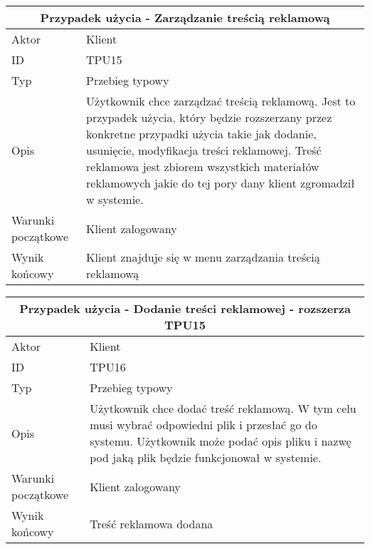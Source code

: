 \documentclass[10pt,a4paper,titlepage]{article} %
\begin{document}
		\begin {center}
		\begin{tabular}{|l|p{10cm}|}
		  \hline
		  \multicolumn{2}{|c|}{\bf Przypadek użycia - Zarządzanie treścią reklamową}\\\hline
		  \hline
		  Aktor & Klient \\ \hline
		  ID & TPU15 \\ \hline
		  Typ & Przebieg typowy \\ \hline
		  Opis & Użytkownik chce zarządzać treścią reklamową. Jest to przypadek
		  użycia, który będzie rozszerzany przez konkretne przypadki użycia takie jak
		  dodanie, usunięcie, modyfikacja treści reklamowej. Treść reklamowa jest
		  zbiorem wszystkich materiałów reklamowych jakie do tej pory dany klient
		  zgromadził w systemie.
		  \\
		  \hline Warunki początkowe & Klient zalogowany \\ \hline
		  Wynik końcowy & Klient znajduje się w menu zarządzania treścią reklamową  \\
		  \hline
		\end{tabular}
		\end{center}
		
		\begin {center}
		\begin{tabular}{|l|p{10cm}|}
		  \hline
		  \multicolumn{2}{|c|}{\bf Przypadek użycia - Dodanie treści
		  reklamowej - rozszerza TPU15}\\\hline
		  \hline
		  Aktor & Klient \\ \hline
		  ID & TPU16 \\ \hline
		  Typ & Przebieg typowy \\ \hline
		  Opis & Użytkownik chce dodać treść reklamową. W tym celu musi wybrać
		  odpowiedni plik i przesłać go do systemu. Użytkownik może podać opis pliku i
		  nazwę pod jaką plik będzie funkcjonował w systemie.
		  \\
		  \hline Warunki początkowe & Klient zalogowany \\ \hline
		  Wynik końcowy & Treść reklamowa dodana  \\
		  \hline
		\end{tabular}
		\end{center}
		
\end{document}
